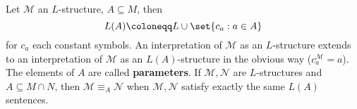 \documentclass{article}
\begin{document}
\begin{ndef}\label{def:3.6}
  Let $\mathcal{M}$ an $L$-structure, $A \subseteq M$, then
  \begin{equation*}
    L(A) \coloneqq L \cup \set{c_a : a \in A}
  \end{equation*}
  for $c_a$ each constant symbols.
  An interpretation of $\mathcal{M}$ as an $L$-structure extends to an interpretation of $\mathcal{M}$ as an $L(A)$-structure in the obvious way ($c_a^\mathcal{M} = a$).
  The elements of $A$ are called \textbf{parameters}.
  If $\mathcal{M}, \mathcal{N}$ are $L$-structures and $A \subseteq M \cap N$, then $\mathcal{M} \equiv_A \mathcal{N}$ when $\mathcal{M}, \mathcal{N}$ satisfy exactly the same $L(A)$ sentences.
\end{ndef}
\printindex
\end{document}
